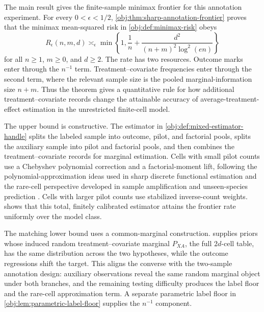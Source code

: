 The main result gives the finite-sample minimax frontier for this annotation experiment. For every \(0<\epsilon<1/2\), \cref{obj:thm:sharp-annotation-frontier} proves that the minimax mean-squared risk in \cref{obj:def:minimax-risk} obeys
\[
R_\epsilon(n,m,d)\asymp_\epsilon
\min\left\{1,\frac1n+\frac{d^2}{(n+m)^2\log^2(en)}\right\}
\]
for all \(n\ge1\), \(m\ge0\), and \(d\ge2\). The rate has two resources. Outcome marks enter through the \(n^{-1}\) term. Treatment--covariate frequencies enter through the second term, where the relevant sample size is the pooled marginal-information size \(n+m\). Thus the theorem gives a quantitative rule for how additional treatment--covariate records change the attainable accuracy of average-treatment-effect estimation in the unrestricted finite-cell model.

The upper bound is constructive. The estimator in \cref{obj:def:mixed-estimator-handle} splits the labeled sample into outcome, pilot, and factorial pools, splits the auxiliary sample into pilot and factorial pools, and then combines the treatment--covariate records for marginal estimation. Cells with small pilot counts use a Chebyshev polynomial correction and a factorial-moment lift, following the polynomial-approximation ideas used in sharp discrete functional estimation \citep{JiaoVenkatHanWeissman2015,WuYang2016} and the rare-cell perspective developed in sample amplification and unseen-species prediction \citep{ValiantValiant2017,OrlitskySureshWu2016}. Cells with larger pilot counts use stabilized inverse-count weights.  shows that this total, finitely calibrated estimator attains the frontier rate uniformly over the model class.

The matching lower bound uses a common-marginal construction.  supplies priors whose induced random treatment--covariate marginal \(P_{XA}\), the full \(2d\)-cell table, has the same distribution across the two hypotheses, while the outcome regressions shift the target. This aligns the converse with the two-sample annotation design: auxiliary observations reveal the same random marginal object under both branches, and the remaining testing difficulty produces the label floor and the rare-cell approximation term. A separate parametric label floor in \cref{obj:lem:parametric-label-floor} supplies the \(n^{-1}\) component.

